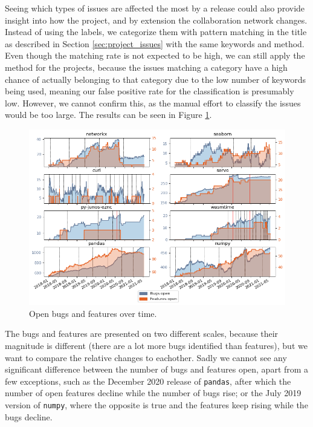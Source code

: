 Seeing which types of issues are affected the most by a release could also provide insight into how the project, and by extension the collaboration network changes. Instead of using the labels, we categorize them with pattern matching in the title as described in Section \ref{sec:project_issues} with the same keywords and method. Even though the matching rate is not expected to be high, we can still apply the method for the projects, because the issues matching a category have a high chance of actually belonging to that category due to the low number of keywords being used, meaning our false positive rate for the classification is presumably low. However, we cannot confirm this, as the manual effort to classify the issues would be too large. The results can be seen in Figure \ref{fig:open_bugs_features}.

\begin{figure}
    \centering
    \includegraphics[width=\textwidth]{figures/qualitative/issues_closed_created/features_and_bugs.png}
    \caption{Open bugs and features over time.}
    \label{fig:open_bugs_features}
\end{figure}

The bugs and features are presented on two different scales, because their magnitude is different (there are a lot more bugs identified than features), but we want to compare the relative changes to eachother. Sadly we cannot see any significant difference between the number of bugs and features open, apart from a few exceptions, such as the December 2020 release of \texttt{pandas}, after which the number of open features decline while the number of bugs rise; or the July 2019 version of \texttt{numpy}, where the opposite is true and the features keep rising while the bugs decline.

